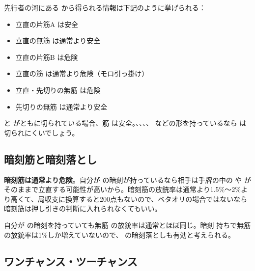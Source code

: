\documentclass[10pt, twocolumn]{article}
\begin{document}
先行者の河にある  から得られる情報は下記のように挙げられる：

\begin{itemize}
\item {} 立直の片筋A  は安全
\item {} 立直の無筋  は通常より安全
\item {} 立直の片筋B  は危険
\item {} 立直の筋  は通常より危険（モロ引っ掛け）
\item {} 立直・先切りの無筋  は危険
\item {} 先切りの無筋  は通常より安全
\end{itemize}

 と  がともに切られている場合、筋  は安全\citep[][p. 165]{miinin-stat}。、、、、 などの形を持っているなら  は切られにくいでしょう。

\subsection{暗刻筋と暗刻落とし}

\textbf{暗刻筋は通常より危険}\citep[][pp. 166--167]{miinin-stat}。自分が  の暗刻が持っているなら相手は手牌の中の  や  がそのままで立直する可能性が高いから。暗刻筋の放銃率は通常より1.5\%〜2\%より高くて、局収支に換算すると200点もないので、ベタオリの場合ではないなら暗刻筋は押し引きの判断に入れられなくてもいい。

自分が  の暗刻を持っていても無筋  の放銃率は通常とほぼ同じ。暗刻  持ちで無筋  の放銃率は1\%しか増えていないので、 の暗刻落としも有効と考えられる\citep[][p. 168]{miinin-stat}。

\subsection{ワンチャンス・ツーチャンス}
\end{document}
